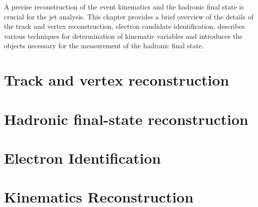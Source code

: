 A precise reconstruction of the event kinematics and the hadronic final state is crucial for the jet analysis. This chapter provides a brief overview of the details of the track and vertex reconstruction, electron candidate identification, describes various techniques for determination of kinematic variables and introduces the objects necessary for the measurement of the hadronic final state. 

\section{Track and vertex reconstruction}
\label{sec:trackvtxreco}


\section{Hadronic final-state reconstruction}
\label{sec:hadronreco}


\section{Electron Identification}
\label{sec:eleid}


\section{Kinematics Reconstruction}
\label{sec:kinrec}



